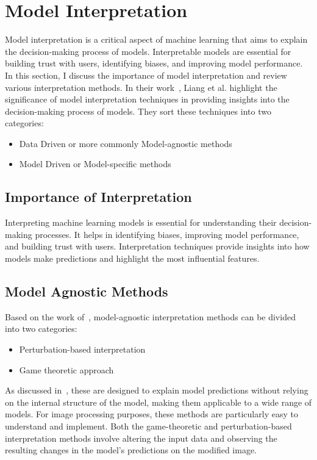 
\section{Model Interpretation}\label{sec:model-interpretation}

Model interpretation is a critical aspect of machine learning that aims to explain the decision-making process of models.
Interpretable models are essential for building trust with users, identifying biases, and improving model performance.
In this section, I discuss the importance of model interpretation and review various interpretation methods.
In their work~\cite{LIANG2021168}, Liang et al. highlight the significance of model interpretation techniques
in providing insights into the decision-making process of models.
They sort these techniques into two categories:
\begin{itemize}
    \item Data Driven or more commonly Model-agnostic methods
    \item Model Driven or Model-specific methods
\end{itemize}

\subsection{Importance of Interpretation}\label{subsec:importance-of-interpretation}

Interpreting machine learning models is essential for understanding their decision-making processes.
It helps in identifying biases, improving model performance, and building trust with users.
Interpretation techniques provide insights into how models make predictions and highlight
the most influential features.

\subsection{Model Agnostic Methods}\label{subsec:model-agnostic-methods}
Based on the work of~\cite{LIANG2021168}, model-agnostic interpretation methods can be divided into two categories:
\begin{itemize}
    \item Perturbation-based interpretation
    \item Game theoretic approach
\end{itemize}

As discussed in~\cite{LIANG2021168}, these are designed to explain model predictions without relying on the internal structure of the model,
making them applicable to a wide range of models.
For image processing purposes, these methods are particularly easy to understand and implement.
Both the game-theoretic and perturbation-based interpretation methods involve altering the input data
and observing the resulting changes in the model's predictions on the modified image.


